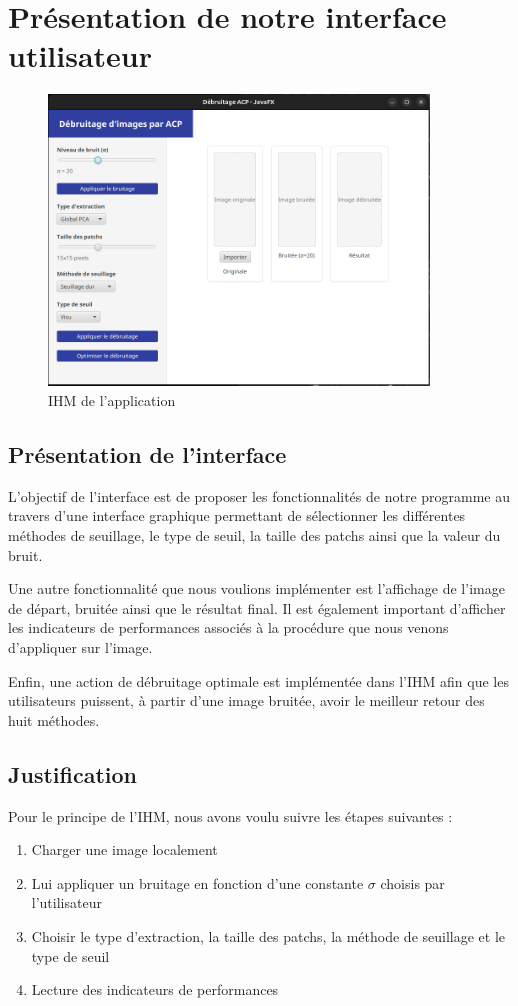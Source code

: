 \section{Présentation de notre interface utilisateur}
\begin{figure}[hbt!]
    \centering
    \includegraphics[width=0.9\textwidth]{reference/picture/ihm.png}
    \caption{IHM de l'application}
\end{figure}
\subsection{Présentation de l'interface}
L'objectif de l'interface est de proposer les fonctionnalités de notre programme au travers d'une interface graphique permettant de sélectionner les différentes méthodes de seuillage, le type de seuil, la taille des patchs ainsi que la valeur du bruit. \par
Une autre fonctionnalité que nous voulions implémenter est l'affichage de l'image de départ, bruitée ainsi que le résultat final. Il est également important d'afficher les indicateurs de performances associés à la procédure que nous venons d'appliquer sur l'image. \par
Enfin, une action de débruitage optimale est implémentée dans l'IHM afin que les utilisateurs puissent, à partir d'une image bruitée, avoir le meilleur retour des huit méthodes.
\subsection{Justification}
Pour le principe de l'IHM, nous avons voulu suivre les étapes suivantes :
\begin{enumerate}
    \item Charger une image localement
    \item Lui appliquer un bruitage en fonction d'une constante \(\sigma\) choisis par l’utilisateur
    \item Choisir le type d'extraction, la taille des patchs, la méthode de seuillage et le type de seuil
    \item Lecture des indicateurs de performances
\end{enumerate}

